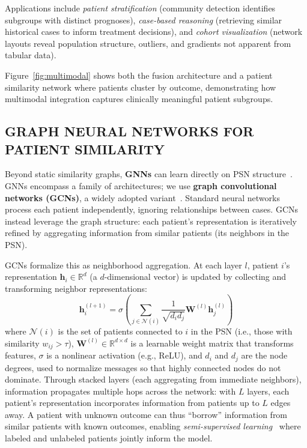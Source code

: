 \documentclass[krantz2,ChapterTOCs]{krantz}
\begin{document}
Applications include \emph{patient stratification} (community detection identifies subgroups with distinct prognoses), \emph{case-based reasoning} (retrieving similar historical cases to inform treatment decisions), and \emph{cohort visualization} (network layouts reveal population structure, outliers, and gradients not apparent from tabular data).

Figure~\ref{fig:multimodal} shows both the fusion architecture and a patient similarity network where patients cluster by outcome, demonstrating how multimodal integration captures clinically meaningful patient subgroups.

\subsection{GRAPH NEURAL NETWORKS FOR PATIENT SIMILARITY}

Beyond static similarity graphs, \textbf{GNNs} can learn directly on PSN structure~\citep{valous2024graph}.
GNNs encompass a family of architectures; we use \textbf{graph convolutional networks (GCNs)}, a widely adopted variant~\citep{kipf2017semi}.
Standard neural networks process each patient independently, ignoring relationships between cases.
GCNs instead leverage the graph structure: each patient's representation is iteratively refined by aggregating information from similar patients (its neighbors in the PSN).

GCNs formalize this as neighborhood aggregation.
At each layer $l$, patient $i$'s representation $\mathbf{h}_i \in \mathbb{R}^d$ (a $d$-dimensional vector) is updated by collecting and transforming neighbor representations:
\begin{equation*}
\mathbf{h}_i^{(l+1)} = \sigma\left(\sum_{j \in \mathcal{N}(i)} \frac{1}{\sqrt{d_i d_j}} \mathbf{W}^{(l)} \mathbf{h}_j^{(l)}\right)
\end{equation*}
where $\mathcal{N}(i)$ is the set of patients connected to $i$ in the PSN (i.e., those with similarity $w_{ij} > \tau$), $\mathbf{W}^{(l)} \in \mathbb{R}^{d \times d}$ is a learnable weight matrix that transforms features, $\sigma$ is a nonlinear activation (e.g., ReLU), and $d_i$ and $d_j$ are the node degrees, used to normalize messages so that highly connected nodes do not dominate.
Through stacked layers (each aggregating from immediate neighbors), information propagates multiple hops across the network: with $L$ layers, each patient's representation incorporates information from patients up to $L$ edges away.
A patient with unknown outcome can thus ``borrow'' information from similar patients with known outcomes, enabling \emph{semi-supervised learning}~\citep{kipf2017semi} where labeled and unlabeled patients jointly inform the model.
\end{document}
